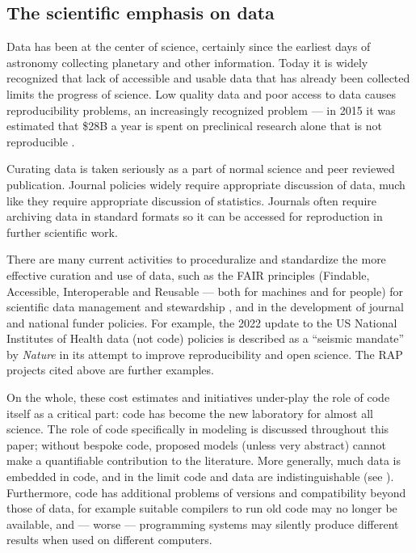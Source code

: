 \documentclass{comjnl}
\begin{document}
\begin{change}
\subsection{The scientific emphasis on data}
Data has been at the center of science, certainly since the earliest days of astronomy collecting planetary and other information. Today it is widely recognized that lack of accessible and usable data that has already been collected limits the progress of science. Low quality data and poor access to data causes reproducibility problems, an increasingly recognized problem --- in 2015 it was estimated that \$28B a year is spent on preclinical research alone that is not reproducible \cite{preclinical-reproducibility}.

Curating data is taken seriously as a part of normal science and peer reviewed publication. Journal policies widely require appropriate discussion of data, much like they require appropriate discussion of statistics. Journals often require archiving data in standard formats so it can be accessed for reproduction in further scientific work. 

There are many current activities to proceduralize and standardize the more effective curation and use of data, such as the FAIR principles (Findable, Accessible, Interoperable and Reusable --- both for machines and for people) for scientific data management and stewardship \cite{fair}, and in the development of journal and national funder policies. For example, the 2022 update to the US National Institutes of Health data (not code) policies \cite{nih-policy} is described as a ``seismic mandate'' by \emph{Nature\/} \cite{nih-nature} in its attempt to improve reproducibility and open science. The RAP projects cited above are further examples.

On the whole, these cost estimates and initiatives under-play the role of code itself as a critical part: code has become the new laboratory for almost all science. The role of code specifically in modeling is discussed throughout this paper; without bespoke code, proposed models (unless very abstract) cannot make a quantifiable contribution to the literature. More generally, much data is embedded in code, and in the limit code and data are indistinguishable (see \supplement). Furthermore, code has additional problems of versions and compatibility beyond those of data, for example suitable compilers to run old code may no longer be available, and --- worse --- programming systems may silently produce different results when used on different computers. 


\end{change}
\end{document}
